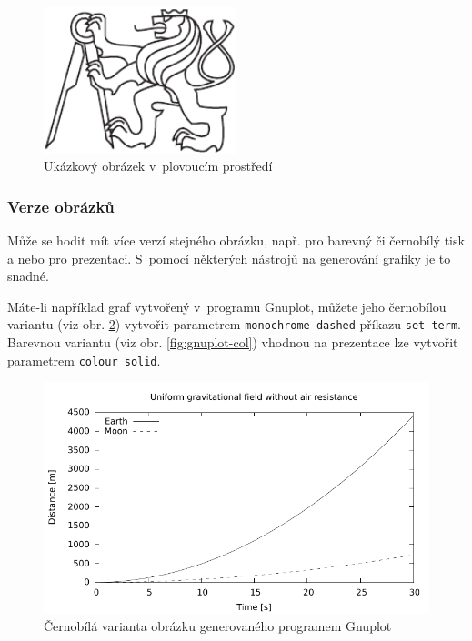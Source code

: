 \documentclass[thesis=B,czech]{FITthesis}[2011/06/14]
\begin{document}
 \begin{figure}[h]\centering
 	\includegraphics[width=0.5\textwidth, angle=30]{cvut-logo-bw}
 	\caption[Příklad obrázku]{Ukázkový obrázek v~plovoucím prostředí}\label{fig:float}
 \end{figure}
 
 \subsubsection{Verze obrázků}
 
 Může se hodit mít více verzí stejného obrázku, např. pro barevný či černobílý tisk a nebo pro prezentaci. S~pomocí některých nástrojů na generování grafiky je to snadné.
 
 Máte-li například graf vytvořený v~programu Gnuplot, můžete jeho černobílou variantu (viz obr. \ref{fig:gnuplot-bw}) vytvořit parametrem \verb|monochrome dashed| příkazu \verb|set term|. Barevnou variantu (viz obr. \ref{fig:gnuplot-col}) vhodnou na prezentace lze vytvořit parametrem \verb|colour solid|.
 
 \begin{figure}\centering
 	\includegraphics{gnuplot-bw}
 	\caption{Černobílá varianta obrázku generovaného programem Gnuplot}\label{fig:gnuplot-bw}
 \end{figure}
 
\end{document}

